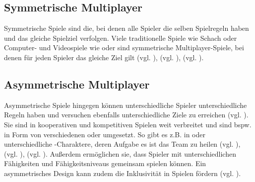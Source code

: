 

\subsection{Symmetrische Multiplayer}
Symmetrische Spiele sind die, bei denen alle Spieler die selben Spielregeln haben und das gleiche Spielziel verfolgen. Viele traditionelle Spiele wie Schach oder Computer- und Videospiele wie  oder  sind symmetrische Multiplayer-Spiele, bei denen für jeden Spieler das gleiche Ziel gilt (vgl. \cite[S. 12]{adams_fundamentals_2013}), (vgl. \cite{noauthor_mario_nodate}), (vgl. \cite{noauthor_willkommen_nodate}). 


\subsection{Asymmetrische Multiplayer}
Asymmetrische Spiele hingegen können unterschiedliche Spieler unterschiedliche Regeln haben und versuchen ebenfalls unterschiedliche Ziele zu erreichen (vgl. \cite[S. 12]{adams_fundamentals_2013}). Sie sind in kooperativen und kompetitiven Spielen weit verbreitet und sind bspw. in Form von verschiedenen  oder  umgesetzt. So gibt es z.B. in  oder   unterschiedliche -Charaktere, deren Aufgabe es ist das Team zu heilen (vgl. \cite{smilovitch_birdquestvr_2019}), (vgl. \cite{noauthor_league_2025}), (vgl. \cite{noauthor_overwatch_nodate}). 
Außerdem ermöglichen sie, dass Spieler mit unterschiedlichen Fähigkeiten und Fähigkeitsniveaus gemeinsam spielen können. Ein asymmetrisches Design kann zudem die Inklusivität in Spielen fördern (vgl. \cite{smilovitch_birdquestvr_2019}).

